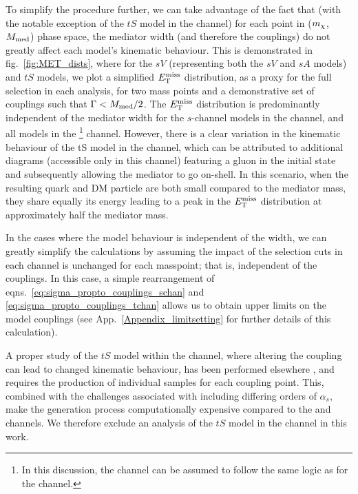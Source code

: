 To simplify the procedure further, we can take advantage of the fact that (with the notable exception of the $tS$ model in the \monojet channel) for each point in ($m_{\chi}$, $M_{\mathrm{med}}$) phase space, the mediator width (and therefore the couplings) do not greatly affect each model's kinematic behaviour. This is demonstrated in fig.~\ref{fig:MET_dists}, where for the $sV$ (representing both the $sV$ and $sA$ models) and $tS$ models, we plot a simplified $E_{\mathrm{T}}^{\mathrm{miss}}$ distribution, as a proxy for the full selection in each analysis, for two mass points and a demonstrative set of couplings such that $\Gamma < M_{\mathrm{med}}/2$. The $E_{\mathrm{T}}^{\mathrm{miss}}$ distribution is predominantly independent of the mediator width for the $s$-channel models in the \monojet channel, and all models in the \monoZ\footnote{In this discussion, the \monoWZ channel can be assumed to follow the same logic as for the \monoZ channel.} channel. However, there is a clear variation in the kinematic behaviour of the tS model in the \monojet channel, which can be attributed to additional diagrams (accessible only in this channel) featuring a gluon in the initial state and subsequently allowing the mediator to go on-shell. In this scenario, when the resulting quark and DM particle are both small compared to the mediator mass, they share equally its energy leading to a peak in the $E_{\mathrm{T}}^{\mathrm{miss}}$ distribution at approximately half the mediator mass.




In the cases where the model behaviour is independent of the width, we can greatly simplify the calculations by assuming the impact of the selection cuts in each channel is unchanged for each masspoint; that is, independent of the couplings. In this case, a simple rearrangement of eqns.~\ref{eq:sigma_propto_couplings_schan} and \ref{eq:sigma_propto_couplings_tchan} allows us to obtain upper limits on the model couplings (see App.~\ref{Appendix_limitsetting} for further details of this calculation).

A proper study of the $tS$ model within the \monojet channel, where altering the coupling can lead to changed kinematic behaviour, has been performed elsewhere \cite{Zurek:tchannel}, and requires the production of individual samples for each coupling point. This, combined with the challenges associated with including differing orders of $\alpha_s$, make the generation process computationally expensive compared to the \monoZ and \monoWZ channels. We therefore exclude an analysis of the $tS$ model in the \monojet channel in this work.

